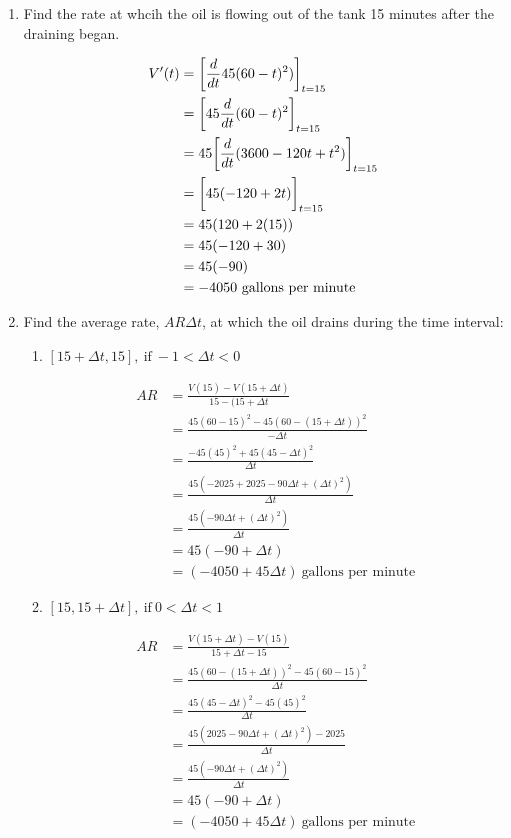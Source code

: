 \documentclass[nooutcomes]{ximera}
\begin{document}
\begin{problem}
\begin{enumerate}
		\item Find the rate at whcih the oil is flowing out of the tank 15 minutes after the draining began.
			\begin{freeResponse}
			\begin{align*}
			V'(t)&= \bigg[ \frac{d }{d t} 45(60-t)^2) \bigg]_{t=15}\\
			&=\bigg[ 45 \frac{d }{d t} (60-t)^2 \bigg]_{t=15}\\
			&=45\bigg[ \frac{d }{d t}(3600-120t+t^2) \bigg]_{t=15}\\
			&=\bigg[ 45(-120+2t) \bigg]_{t=15}\\
			&=45(120+2(15))\\
			&=45(-120+30)\\
			&=45(-90)\\
			&=-4050\ \text{gallons per minute}
			\end{align*}
			\end{freeResponse}
		\item Find the average rate, $AR \Delta t$, at which the oil drains during the time interval:
			\begin{enumerate}
				\item $[15+ \Delta t,15],\ \text{if}\ -1< \Delta t<0$
			\begin{freeResponse}
					\begin{align*}
					AR&= \frac{V(15)-V(15+\Delta t)}{15-(15+\Delta t}\\
					&=\frac{45(60-15)^2-45(60-(15+\Delta t))^2}{-\Delta t}\\
					&=\frac{-45(45)^2+45(45-\Delta t)^2}{\Delta t}\\
					&=\frac{45(-2025+2025-90\Delta t+(\Delta t)^2)}{\Delta t}\\
					&=\frac{45(-90\Delta t+(\Delta t)^2)}{\Delta t}\\
					&=45(-90+\Delta t)\\
					&=(-4050+45\Delta t)\ \text{gallons per minute}			
					\end{align*}
			\end{freeResponse}			

				\item $[15,15+ \Delta t],\ \text{if}\ 0< \Delta t<1$
			\begin{freeResponse}
					\begin{align*}
					AR&= \frac{V(15+\Delta t)-V(15)}{15+\Delta t-15}\\
					&=\frac{45(60-(15+\Delta t))^2-45(60-15)^2}{\Delta t}\\
					&=\frac{45(45-\Delta t)^2-45(45)^2}{\Delta t}\\
					&=\frac{45(2025-90\Delta t+(\Delta t)^2)-2025}{\Delta t}\\
					&=\frac{45(-90\Delta t+(\Delta t)^2)}{\Delta t}\\
					&=45(-90+\Delta t)\\
					&=(-4050+45\Delta t)\ \text{gallons per minute}			
					\end{align*}
			\end{freeResponse}
			\end{enumerate}


\end{enumerate}
\end{problem}
\end{document}
